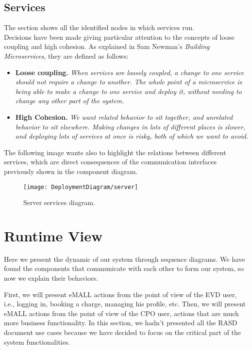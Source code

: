 \subsection{Services}
\label{subsec:services}%
The section shows all the identified nodes in which services run. \\
Decisions have been made giving particular attention to the concepts of loose coupling and high cohesion.
As explained in Sam Newman's \textit{Building Microservices}, they are defined as follows:
\begin{itemize}
    \item \textbf{Loose coupling.} \textit{When services are loosely coupled, a change to one service should not require a change to another.
    The whole point of a microservice is being able to make a change to one service and deploy it,
        without needing to change any other part of the system.}
    \item \textbf{High Cohesion.} \textit{We want related behavior to sit together, and unrelated behavior to sit elsewhere.
    Making changes in lots of different places is slower, and deploying lots of services at once is risky, both of which we want to avoid.}
\end{itemize}
The following image wants also to highlight the relations between different services, which are direct consequences of the
communication interfaces previously shown in the component diagram.
\begin{figure} [H]
    \begin{center}
        \texttt{[image: DeploymentDiagram/server]}
        \caption{Server services diagram.}
        \label{fig: services}
    \end{center}
\end{figure}

\newpage


\section{Runtime View}
\label{sec:runtime_view}%
Here we present the dynamic of our system through sequence diagrams.
We have found the components that communicate with each other to form our system, so now we explain their behaviors.

First, we will present eMALL actions from the point of view of the EVD user, i.e., logging in, booking a charge, managing his profile, etc.
Then, we will present eMALL actions from the point of view of the CPO user, actions that are much more business functionality.
In this section, we hadn't presented all the RASD document use cases because we have decided to focus on the critical part of the system functionalities.

